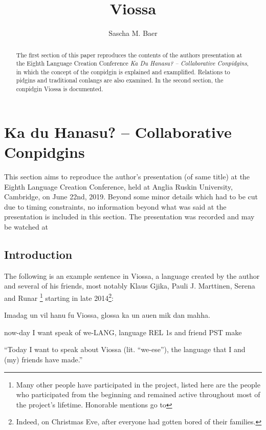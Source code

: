 \documentclass[a4paper,abstracton]{scrartcl}
\title{Viossa}
\author{Sascha M. Baer}
\begin{document}
\maketitle
\begin{abstract}
The first section of this paper reproduces the contents of the authors presentation at the Eighth Language Creation Conference \emph{Ka Du Hanasu? \--- Collaborative Conpidgins}, in which the concept of the conpidgin is explained and examplified. Relations to pidgins and traditional conlangs are also examined. In the second section, the conpidgin Viossa is documented. 
\end{abstract}

\section{Ka du Hanasu? \--- Collaborative Conpidgins}
This section aims to reproduce the author’s presentation (of same title) at the Eighth Language Creation Conference, held at Anglia Ruskin University, Cambridge, on June 22nd, 2019. Beyond some minor details which had to be cut due to timing constraints, no information beyond what was said at the presentation is included in this section. The presentation was recorded and may be watched at %

\subsection{Introduction}
The following is an example sentence in Viossa, a language created by the author and several of his friends, most notably Klaus Gjika, Pauli J. Marttinen, Serena and Runar%
\footnote{Many other people have participated in the project, listed here are the people who participated from the beginning and remained active throughout most of the project’s lifetime. Honorable mentions go to} %
starting in late 2014\footnote{Indeed, on Christmas Eve, after everyone had gotten bored of their families.}:

Imadag un vil hanu fu Viossa, glossa ka un auen mik dan mahha.

now-day I want speak of we-LANG, language REL 1s and friend PST make

“Today I want to speak about Viossa (lit. “we-ese”), the language that I and (my) friends have made.”
%
\end{document}
